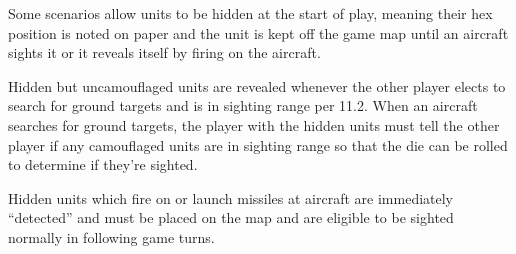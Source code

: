 \begin{advancedrules}
Some scenarios allow units to be hidden at the start of play, meaning their hex position is noted on paper and the unit is kept off the game map until an aircraft sights it or it reveals itself by firing on the aircraft.

Hidden but uncamouflaged units are revealed whenever the other player elects to search for ground targets and is in sighting range per 11.2. When an aircraft searches for ground targets, the player with the hidden units must tell the other player if any camouflaged units are in sighting range so that the die can be rolled to determine if they're sighted.

Hidden units which fire on or launch missiles at aircraft are immediately “detected” and must be placed on the map and are eligible to be sighted normally in following game turns.

\fi

\end{advancedrules}
